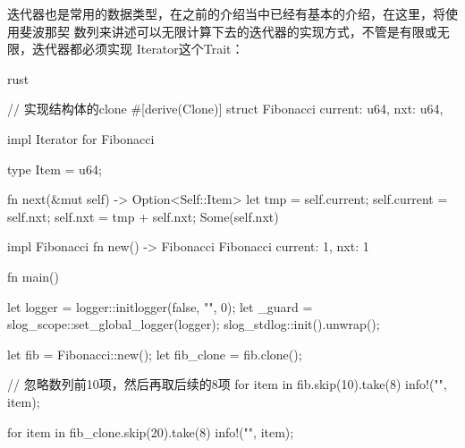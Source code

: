 迭代器也是常用的数据类型，在之前的介绍当中已经有基本的介绍，在这里，将使用斐波那契
数列来讲述可以无限计算下去的迭代器的实现方式，不管是有限或无限，迭代器都必须实现
Iterator这个Trait：
\begin{code-block}{rust}

// 实现结构体的clone
#[derive(Clone)]
struct Fibonacci {
    current: u64,
    nxt: u64,
}

impl Iterator for Fibonacci {
    type Item = u64;

    fn next(&mut self) -> Option<Self::Item> {
        let tmp = self.current;
        self.current = self.nxt;
        self.nxt = tmp + self.nxt;
        Some(self.nxt)
    }
}

impl Fibonacci {
    fn new() -> Fibonacci {
        Fibonacci { current: 1, nxt: 1 }
    }
}

fn main() {
    let logger = logger::initlogger(false, "", 0);
    let _guard = slog_scope::set_global_logger(logger);
    slog_stdlog::init().unwrap();

    let fib = Fibonacci::new();
    let fib_clone = fib.clone();

    // 忽略数列前10项，然后再取后续的8项
    for item in fib.skip(10).take(8) {
        info!("{}", item);
    }

    for item in fib_clone.skip(20).take(8) {
        info!("{}", item);
    }

}
\end{code-block}


